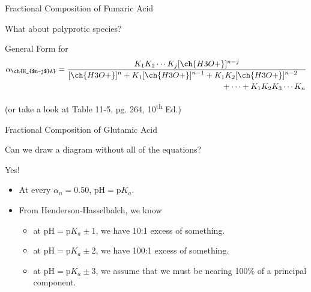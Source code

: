 \documentclass[notes=hide]{beamer}
\begin{document}
\begin{frame}{Fractional Composition of Fumaric Acid}
	\begin{center}
		
	\end{center}
\end{frame}

\begin{frame}{What about polyprotic species?}
	\begin{block}{General Form for }
		\begin{align*}
		\alpha_{\ch{H_{$n-j$}A}} = \frac{K_1 K_2 \cdots K_j
		[\ch{H3O+}]^{n-j}}{
			\begin{multlined}
				[\ch{H3O+}]^n + K_1 [\ch{H3O+}]^{n-1} + K_1K_2
				[\ch{H3O+}]^{n-2} \\ + \cdots + K_1 K_2 K_3
				\cdots K_n
			\end{multlined}
			}
		\end{align*}

		\bigskip

		\begin{center}
			(or take a look at Table 11-5, pg. 264,
			10\textsuperscript{th} Ed.)
		\end{center}
	\end{block}
\end{frame}

\begin{frame}{Fractional Composition of Glutamic Acid}
	\begin{center}
		
	\end{center}
\end{frame}

\begin{frame}{Can we draw a diagram without all of the equations?}
	\pause

	\alert{Yes!}

	\begin{itemize}
		\item At every $\alpha_n = 0.50$, $\text{pH} = \text{p}K_a$.
		\item From Henderson-Hasselbalch, we know
			\begin{itemize}
				\item at $\text{pH} = \text{p}K_a \pm 1$, we
					have 10:1 excess of something.
				\item at $\text{pH} = \text{p}K_a \pm 2$, we
					have 100:1 excess of something.
				\item at $\text{pH} = \text{p}K_a \pm 3$, we
					assume that we must be nearing
					\alert{100\%} of a principal component.
			\end{itemize}
	\end{itemize}
\end{frame}
\end{document}
